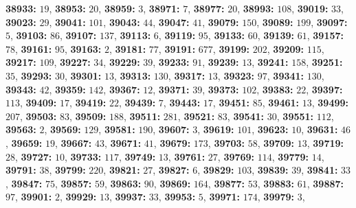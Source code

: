 \textsf{\bfseries 38933:} $19$, \textsf{\bfseries 38953:} $20$, \textsf{\bfseries 38959:} $3$, \textsf{\bfseries 38971:} $7$, \textsf{\bfseries 38977:} $20$, \textsf{\bfseries 38993:} $108$, \textsf{\bfseries 39019:} $33$, \textsf{\bfseries 39023:} $29$, \textsf{\bfseries 39041:} $101$, \textsf{\bfseries 39043:} $44$, \textsf{\bfseries 39047:} $41$, \textsf{\bfseries 39079:} $150$, \textsf{\bfseries 39089:} $199$, \textsf{\bfseries 39097:} $5$, \textsf{\bfseries 39103:} $86$, \textsf{\bfseries 39107:} $137$, \textsf{\bfseries 39113:} $6$, \textsf{\bfseries 39119:} $95$, \textsf{\bfseries 39133:} $60$, \textsf{\bfseries 39139:} $61$, \textsf{\bfseries 39157:} $78$, \textsf{\bfseries 39161:} $95$, \textsf{\bfseries 39163:} $2$, \textsf{\bfseries 39181:} $77$, \textsf{\bfseries 39191:} $677$, \textsf{\bfseries 39199:} $202$, \textsf{\bfseries 39209:} $115$, \textsf{\bfseries 39217:} $109$, \textsf{\bfseries 39227:} $34$, \textsf{\bfseries 39229:} $39$, \textsf{\bfseries 39233:} $91$, \textsf{\bfseries 39239:} $13$, \textsf{\bfseries 39241:} $158$, \textsf{\bfseries 39251:} $35$, \textsf{\bfseries 39293:} $30$, \textsf{\bfseries 39301:} $13$, \textsf{\bfseries 39313:} $130$, \textsf{\bfseries 39317:} $13$, \textsf{\bfseries 39323:} $97$, \textsf{\bfseries 39341:} $130$, \textsf{\bfseries 39343:} $42$, \textsf{\bfseries 39359:} $142$, \textsf{\bfseries 39367:} $12$, \textsf{\bfseries 39371:} $39$, \textsf{\bfseries 39373:} $102$, \textsf{\bfseries 39383:} $22$, \textsf{\bfseries 39397:} $113$, \textsf{\bfseries 39409:} $17$, \textsf{\bfseries 39419:} $22$, \textsf{\bfseries 39439:} $7$, \textsf{\bfseries 39443:} $17$, \textsf{\bfseries 39451:} $85$, \textsf{\bfseries 39461:} $13$, \textsf{\bfseries 39499:} $207$, \textsf{\bfseries 39503:} $83$, \textsf{\bfseries 39509:} $188$, \textsf{\bfseries 39511:} $281$, \textsf{\bfseries 39521:} $83$, \textsf{\bfseries 39541:} $30$, \textsf{\bfseries 39551:} $112$, \textsf{\bfseries 39563:} $2$, \textsf{\bfseries 39569:} $129$, \textsf{\bfseries 39581:} $190$, \textsf{\bfseries 39607:} $3$, \textsf{\bfseries 39619:} $101$, \textsf{\bfseries 39623:} $10$, \textsf{\bfseries 39631:} $46$, \textsf{\bfseries 39659:} $19$, \textsf{\bfseries 39667:} $43$, \textsf{\bfseries 39671:} $41$, \textsf{\bfseries 39679:} $173$, \textsf{\bfseries 39703:} $58$, \textsf{\bfseries 39709:} $13$, \textsf{\bfseries 39719:} $28$, \textsf{\bfseries 39727:} $10$, \textsf{\bfseries 39733:} $117$, \textsf{\bfseries 39749:} $13$, \textsf{\bfseries 39761:} $27$, \textsf{\bfseries 39769:} $114$, \textsf{\bfseries 39779:} $14$, \textsf{\bfseries 39791:} $38$, \textsf{\bfseries 39799:} $220$, \textsf{\bfseries 39821:} $27$, \textsf{\bfseries 39827:} $6$, \textsf{\bfseries 39829:} $103$, \textsf{\bfseries 39839:} $39$, \textsf{\bfseries 39841:} $33$, \textsf{\bfseries 39847:} $75$, \textsf{\bfseries 39857:} $59$, \textsf{\bfseries 39863:} $90$, \textsf{\bfseries 39869:} $164$, \textsf{\bfseries 39877:} $53$, \textsf{\bfseries 39883:} $61$, \textsf{\bfseries 39887:} $97$, \textsf{\bfseries 39901:} $2$, \textsf{\bfseries 39929:} $13$, \textsf{\bfseries 39937:} $33$, \textsf{\bfseries 39953:} $5$, \textsf{\bfseries 39971:} $174$, \textsf{\bfseries 39979:} $3$, 
